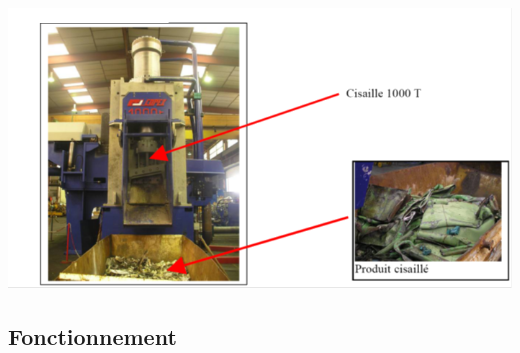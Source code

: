\documentclass[10pt,oneside]{article}
\begin{document}
{\begin{center}
\includegraphics[width=.75\textwidth]{png/fig3}
\end{center}
}

\subsection{Fonctionnement}
\end{document}
